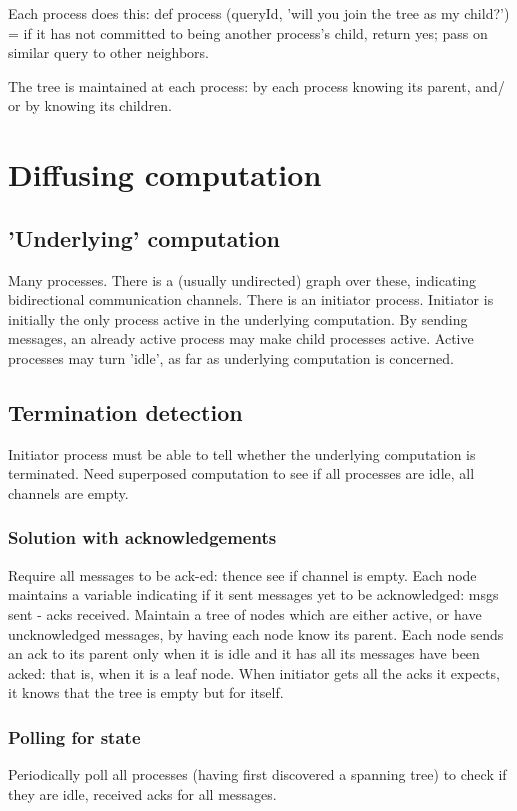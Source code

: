 \documentclass[oneside, article]{memoir}
\begin{document}
Each process does this:
def process (queryId, 'will you join the tree as my child?') = if it has not committed to being another process's child, return yes; pass on similar query to other neighbors.

The tree is maintained at each process: by each process knowing its parent, and/ or by knowing its children.

\section{Diffusing computation}
\subsection{'Underlying' computation}
Many processes. There is a (usually undirected) graph over these, indicating bidirectional communication channels. There is an initiator process. Initiator is initially the only process active in the underlying computation. By sending messages, an already active process may make child processes active. Active processes may turn 'idle', as far as underlying computation is concerned.

\subsection{Termination detection}
Initiator process must be able to tell whether the underlying computation is terminated. Need superposed computation to see if all processes are idle, all channels are empty.

\subsubsection{Solution with acknowledgements}
Require all messages to be ack-ed: thence see if channel is empty. Each node maintains a variable indicating if it sent messages yet to be acknowledged: msgs sent - acks received. Maintain a tree of nodes which are either active, or have uncknowledged messages, by having each node know its parent. Each node sends an ack to its parent only when it is idle and it has all its messages have been acked: that is, when it is a leaf node. When initiator gets all the acks it expects, it knows that the tree is empty but for itself.

\subsubsection{Polling for state}
Periodically poll all processes (having first discovered a spanning tree) to check if they are idle, received acks for all messages.
\end{document}
